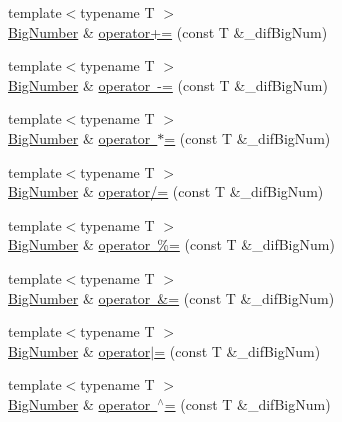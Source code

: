 \begin{DoxyCompactItemize}
\item 
{\footnotesize template$<$typename T $>$ }\\\mbox{\hyperlink{class_big_nums_1_1_big_number}{Big\+Number}} \& \mbox{\hyperlink{class_big_nums_1_1_big_number_a99a14e0f44f08f04dd686a8fb1251338}{operator+=}} (const T \&\+\_\+dif\+Big\+Num)
\item 
{\footnotesize template$<$typename T $>$ }\\\mbox{\hyperlink{class_big_nums_1_1_big_number}{Big\+Number}} \& \mbox{\hyperlink{class_big_nums_1_1_big_number_a2ac4094870ea13bc9b81c712dabe173e}{operator -\/=}} (const T \&\+\_\+dif\+Big\+Num)
\item 
{\footnotesize template$<$typename T $>$ }\\\mbox{\hyperlink{class_big_nums_1_1_big_number}{Big\+Number}} \& \mbox{\hyperlink{class_big_nums_1_1_big_number_a1fc741b943e941757495f5fc9663dd45}{operator $\ast$=}} (const T \&\+\_\+dif\+Big\+Num)
\item 
{\footnotesize template$<$typename T $>$ }\\\mbox{\hyperlink{class_big_nums_1_1_big_number}{Big\+Number}} \& \mbox{\hyperlink{class_big_nums_1_1_big_number_adff2df5d7288c36d4ab7dfd0b6f5ede4}{operator/=}} (const T \&\+\_\+dif\+Big\+Num)
\item 
{\footnotesize template$<$typename T $>$ }\\\mbox{\hyperlink{class_big_nums_1_1_big_number}{Big\+Number}} \& \mbox{\hyperlink{class_big_nums_1_1_big_number_a697d3b997151dcb9e0fe10e5ac44676a}{operator \%=}} (const T \&\+\_\+dif\+Big\+Num)
\item 
{\footnotesize template$<$typename T $>$ }\\\mbox{\hyperlink{class_big_nums_1_1_big_number}{Big\+Number}} \& \mbox{\hyperlink{class_big_nums_1_1_big_number_af98f69c51b85dc6d7af162346d8c40f4}{operator \&=}} (const T \&\+\_\+dif\+Big\+Num)
\item 
{\footnotesize template$<$typename T $>$ }\\\mbox{\hyperlink{class_big_nums_1_1_big_number}{Big\+Number}} \& \mbox{\hyperlink{class_big_nums_1_1_big_number_acae6ae7757f89b2971c22d5d3c0cca29}{operator$\vert$=}} (const T \&\+\_\+dif\+Big\+Num)
\item 
{\footnotesize template$<$typename T $>$ }\\\mbox{\hyperlink{class_big_nums_1_1_big_number}{Big\+Number}} \& \mbox{\hyperlink{class_big_nums_1_1_big_number_a76fe5402cd5bcd53c850ce31704b5b57}{operator $^\wedge$=}} (const T \&\+\_\+dif\+Big\+Num)

\end{DoxyCompactItemize}

